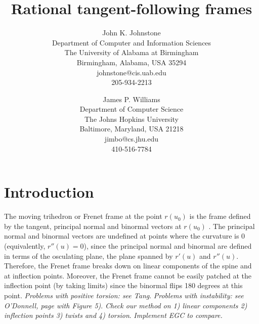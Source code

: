 \newtheorem{rmk}{Remark}[section]
\newtheorem{example}{Example}[section]
\newtheorem{conjecture}{Conjecture}[section]
\newtheorem{claim}{Claim}[section]
\newtheorem{notation}{Notation}[section]
\newtheorem{lemma}{Lemma}[section]
\newtheorem{theorem}{Theorem}[section]
\newtheorem{corollary}{Corollary}[section]
\newtheorem{defn2}{Definition}


\setlength{\oddsidemargin}{0pt}
\setlength{\topmargin}{-.25in}	%
\setlength{\headsep}{0pt}
\setlength{\textheight}{8.75in}
\setlength{\textwidth}{6.5in}
\setlength{\columnsep}{5mm}		%

\title{Rational tangent-following frames}
\author{John K. Johnstone\\
	Department of Computer and Information Sciences\\
	The University of Alabama at Birmingham\\
	Birmingham, Alabama, USA 35294\\
	johnstone@cis.uab.edu\\
	205-934-2213
	\and 
	James P. Williams\\
	Department of Computer Science\\
	The Johns Hopkins University\\
	Baltimore, Maryland, USA 21218\\
	jimbo@cs.jhu.edu\\
	410-516-7784}



\maketitle

\begin{abstract}
\end{abstract}

\section{Introduction}

The moving trihedron or Frenet frame at the point $r(u_0)$ is the frame
defined by the tangent, principal normal and binormal vectors at $r(u_0)$
\cite{kreyszig}.   %
The principal normal and binormal vectors are undefined
at points where the curvature is 0 (equivalently, $r''(u)=0$),
since the principal normal and binormal are defined in terms of the
osculating plane, the plane spanned by $r'(u)$ and $r''(u)$.
Therefore, the Frenet frame breaks down on linear components of the spine
and at inflection points.
Moreover, the Frenet frame cannot be easily patched at the inflection point
(by taking limits) since the binormal flips 180 degrees at this point.
{\em Problems with positive torsion: see Tang}.
{\em Problems with instability: see O'Donnell, page with Figure 5)}.
{\em Check our method on 1) linear components 2) inflection points
3) twists and 4) torsion}.
{\em Implement EGC to compare.}

